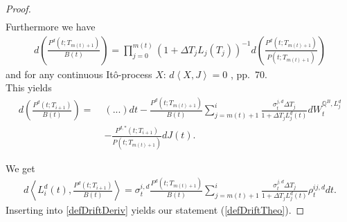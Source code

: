 \documentclass[12pt]{article}
\begin{document}
\begin{proof}
\begin{align*}
		\end{align*}
		Furthermore we have
		\begin{align*}
			d\left(\frac{P^d(t;T_{m(t)+1})}{B(t)}\right) = \prod_{j=0}^{m(t)}(1+\Delta T_j L_j(T_j))^{-1}
			d\left(\frac{P^d(t;T_{m(t)+1})}{P(t;T_{m(t)+1})}\right)
		\end{align*}
		and for any continuous Itô-process $X$: $ d\left\langle X, J\right \rangle = 0$ \cite{protter}, pp.\ 70.\\
		This yields
		\begin{align*}
			d\left(\frac{P^d(t;T_{i+1})}{B(t)}\right) = \;& 
			 (...)dt - \frac{P^d(t;T_{m(t)+1})}{B(t)} \sum_{j=m(t)+1}^{i}\frac{\sigma^{j, d}_t \Delta T_j}{1 + \Delta T_j L^d_j(t)} dW^{\mathbb{Q}^B, L^d_j}_t \\
			 & - \frac{P^{d,*}(t;T_{i + 1})}{P(t;T_{m(t)+1})}dJ(t).
		\end{align*}
		
		We get 
		\begin{align*}
			d\left\langle  L_i^d(t), \frac{P^d(t;T_{i+1})}{B(t)} \right\rangle = \sigma^{i, d}_t \frac{P^d(t;T_{m(t)+1})}{B(t)} \sum_{j=m(t)+1}^{i}\frac{\sigma^{j, d}_t\Delta T_j}{1 + \Delta T_j L^d_j(t)}\rho^{i j, d}_t  dt.
		\end{align*}
		Inserting into \cref{defDriftDeriv} yields our statement (\ref{defDriftTheo}).
	\end{proof}
	
\end{document}

